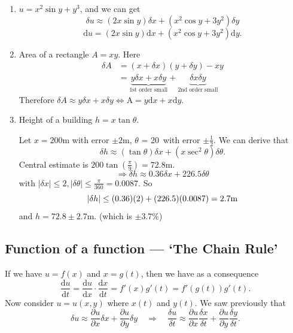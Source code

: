\documentclass[12pt]{report}
\theoremstyle{definition}
\begin{document}
\begin{enumerate}[label = (\roman*)]
    \item $u = x^{2}\sin{y} + y^{3}$, and we can get\[
            \delta u \approx (2x\sin{y})\delta x + (x^{2}\cos{y} + 3y^{2})\delta y
    \]\[
    \mathrm{d}u = (2x\sin{y})\mathrm{d}x + (x^{2}\cos{y} + 3y^{2})\mathrm{d}y.
    \]

\item Area of a rectangle $A = xy$. Here\[
    \begin{align*}
        \delta A & = (x + \delta x)(y + \delta y) - xy \\
                 & = \underbrace{y\delta x + x\delta y}_\text{1st order small} 
                 + \underbrace{\delta x \delta y}_\text{2nd order small}
    \end{align*}
\]Therefore $\delta A \approx y \delta x + x \delta y \iff
\mathrm{A} = y \mathrm{d}x + x\mathrm{d}y$.

\item Height of a building $h = x\tan{\theta}$.

    Let $x = 200$m with error $\pm 2$m, $\theta$ = 20\textdegree\ with error $\pm \frac{1}{2}$\textdegree.
    We can derive that\[
        \delta h \approx (\tan{\theta})\delta x + (x\sec^{2}{\theta})\delta\theta.
    \]
    Central estimate is $200\tan{\left(\frac{\pi}{9}\right)} = 72.8$m.\[
        \Rightarrow{}\delta h \approx 0.36\delta x + 226.5\delta\theta
    \]with $|\delta x| \le 2, |\delta \theta|\le \frac{\pi}{360} = 0.0087$. So\[
    |\delta h| \le (0.36)(2) + (226.5)(0.0087) = 2.7\textnormal{m}
\]and $h = 72.8 \pm 2.7$m. (which is $\pm 3.7\%$)
\end{enumerate}

\subsection{Function of a function --- `The Chain Rule'}

If we have $u = f(x)$ and $x = g(t)$, then we have as a consequence\[
    \frac{\mathrm{d}u}{\mathrm{d}t} = \frac{\mathrm{d}u}{\mathrm{d}x} \cdot \frac{\mathrm{d}x}{\mathrm{d}t} 
    = f'(x)g'(t) = f'(g(t))g'(t).
\]
Now consider $u = u(x,y)$ where $x(t)$ and $y(t)$. We saw previously that\[
\delta u \approx \frac{\partial u}{\partial x} \delta x + \frac{\partial u}{\partial y} \delta y
\quad\Longrightarrow{}\quad \frac{\delta u}{\delta t} \approx \frac{\partial u}{\partial x}
\frac{\delta x}{\delta t} + \frac{\partial u}{\partial y} \frac{\delta y}{\delta t}.
\]
\end{document}
